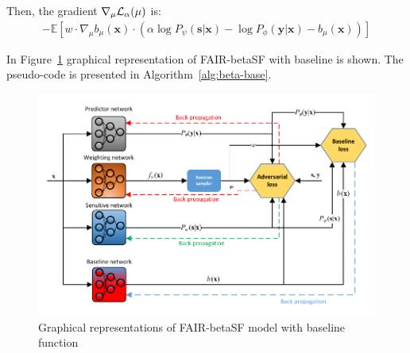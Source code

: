 \documentclass[preprint,12pt]{elsarticle}
\begin{document}
Then, the gradient $\nabla_\mu{\cal L}_\alpha(\mu)$ is:
\begin{equation*}
\begin{split}
-\mathbb{E} \left[w \cdot \nabla_\mu b_\mu(\mathbf{x})\cdot\left(\alpha \log P_\psi(\mathbf{s}|\mathbf{x}) - \log P_\phi(\mathbf{y}|\mathbf{x}) - b_\mu(\mathbf{x})\right)\right]
\end{split}
\end{equation*}

In Figure~\ref{fig:Fig2} graphical representation of FAIR-betaSF with baseline is shown. The pseudo-code is presented in Algorithm~\ref{alg:beta-base}.

\begin{figure}[h!]
	\center
	\includegraphics[width=1\textwidth]{Fig2.pdf}
	\captionsetup{justification=centering}
	\caption{Graphical representations of FAIR-betaSF model with baseline function}
	\label{fig:Fig2}
\end{figure}
\end{document}
